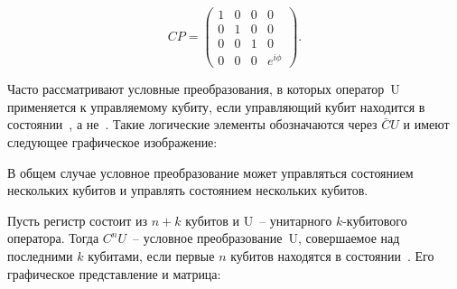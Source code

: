\documentclass[pscyr,notitlepage]{hedwork}
\renewcommand{\~}[1]{\widetilde{#1}}
\begin{document}
  \begin{minipage}{.4\textwidth}
    \center
  \end{minipage}
  \begin{minipage}{.4\textwidth}
    \[
      CP =
      \begin{pmatrix}
        1 & 0 & 0 & 0         \\[-1.7ex]
        0 & 1 & 0 & 0         \\[-1.7ex]
        0 & 0 & 1 & 0         \\[-1.7ex]
        0 & 0 & 0 & e^{i\phi}
      \end{pmatrix}.
    \]
  \end{minipage}
  
  Часто рассматривают условные преобразования, в которых оператор~U применяется
  к управляемому кубиту, если управляющий кубит находится в состоянии~,
  а не~. Такие логические элементы обозначаются через \( \bar{C}U \) и
  имеют следующее графическое изображение:
  \begin{figure}[h!]
    \center
  \end{figure}
  
  В общем случае условное преобразование может управляться состоянием
  нескольких кубитов и управлять состоянием нескольких кубитов.
  
  Пусть регистр состоит из \( n + k \) кубитов и U~-- унитарного
  \( k \)-кубитового оператора. Тогда \( C^nU \)~-- условное
  преобразование~U, совершаемое над последними \( k \) кубитами, если
  первые \( n \) кубитов находятся в состоянии~. Его графическое
  представление и матрица:
  
\end{document}
